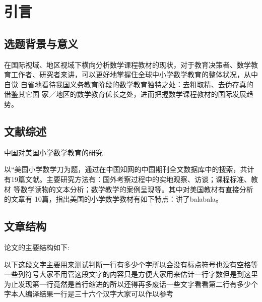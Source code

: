 
\chapter{引言}
\label{chap_int}
\section{选题背景与意义}
在国际视域、地区视域下横向分析数学课程教材的现状，对于教育决策者、数学教
育工作者、研究者来讲，可以更好地掌握住全球中小学数学教育的整体状况，从中自觉
自省地看待我国义务教育阶段的数学教育独特之处：去粗取精、去伪存真的借鉴其它国
家／地区的数学教育优长之处，进而把握数学课程教材的国际发展趋势。




\section{文献综述}
中国对美国小学数学教育的研究

以“美国小学数学刀为题，通过在中国知网的中国期刊全文数据库中的搜索，共计
有19篇文献。主要研究方法有：国外考察过程中的实地观察、访谈；课程标准、教材
等数学读物的文本分析；数学教学的案例呈现等。其中对美国教材有直接分析的文章有
10篇，指出美国的小学数学教材有如下特点：\cite{article1}讲了balabala。



\section{文章结构}
论文的主要结构如下:

以下这段文字主要用来测试判断一行有多少个字所以会没有标点符号也没有空格等一些列符号大家不用管这段文字的内容只是方便大家用来估计一行字数但是到这里为止发现第一行竟然是首行缩进的所以还得再多废话一些文字看看第二行有多少个字本人编译结果一行是三十六个汉字大家可以作以参考


